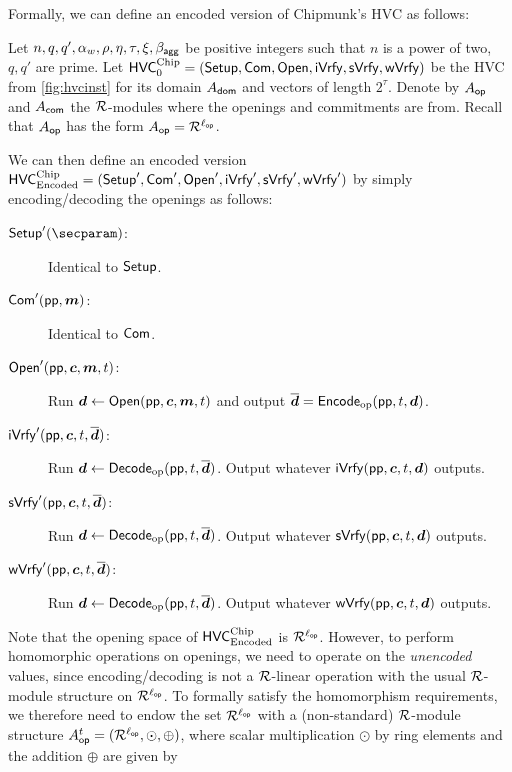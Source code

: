 Formally, we can define an encoded version of Chipmunk's HVC as follows:
\begin{definition}\label{def:encodedhvc}
Let $n,q,q',\alpha_w,\rho,\eta,\tau,\xi,\beta_{\mathsf{agg}}$ be positive integers such that $n$ is a power of two, $q,q'$ are prime.
Let $\mathsf{HVC}^{\textup{Chip}}_{0} = (\mathsf{Setup},\mathsf{Com},\mathsf{Open},\mathsf{iVrfy},\mathsf{sVrfy}, \mathsf{wVrfy})$ be the HVC from \autoref{fig:hvcinst} for its domain $A_{\mathsf{dom}}$ and vectors of length $2^\tau$.
Denote by $A_{\mathsf{op}}$ and $A_{\mathsf{com}}$ the $\mathcal{R}$-modules where the openings and commitments are from.
Recall that $A_{\mathsf{op}}$ has the form $A_{\mathsf{op}} = \mathcal{R}^{\ell_{\mathsf{op}}}$.

We can then define an encoded version $\mathsf{HVC}_{\textup{Encoded}}^{\textup{Chip}} = (\mathsf{Setup}',\mathsf{Com}',\mathsf{Open}',\mathsf{iVrfy}',\mathsf{sVrfy}', \mathsf{wVrfy}')$ by simply encoding/decoding the openings as follows:
\begin{description}
    \item[$\setup'(\secparam)$:] Identical to $\mathsf{Setup}$.
    \item[$\mathsf{Com}'(\mathsf{pp}, \boldsymbol{m})$:] Identical to $\mathsf{Com}$.
    \item[$\mathsf{Open}'(\mathsf{pp},\boldsymbol{c},\boldsymbol{m},t)$:] Run $\boldsymbol{d}\gets\mathsf{Open}(\mathsf{pp},\boldsymbol{c},\boldsymbol{m},t)$ and output $\overline{\boldsymbol{d}} = \mathsf{Encode}_{\mathrm{op}}(\mathsf{pp}, t, \boldsymbol{d})$.
    \item[$\mathsf{iVrfy}'(\mathsf{pp}, \boldsymbol{c},t,\overline{\boldsymbol{d}})$:] Run $\boldsymbol{d}\gets\mathsf{Decode}_{\mathrm{op}}(\mathsf{pp},t,\overline{\boldsymbol{d}})$. Output whatever $\mathsf{iVrfy}(\mathsf{pp},\boldsymbol{c},t,\boldsymbol{d})$ outputs.
    \item[$\mathsf{sVrfy}'(\mathsf{pp}, \boldsymbol{c},t,\overline{\boldsymbol{d}})$:] Run $\boldsymbol{d}\gets\mathsf{Decode}_{\mathrm{op}}(\mathsf{pp},t,\overline{\boldsymbol{d}})$. Output whatever $\mathsf{sVrfy}(\mathsf{pp},\boldsymbol{c},t,\boldsymbol{d})$ outputs.
    \item[$\mathsf{wVrfy}'(\mathsf{pp}, \boldsymbol{c},t,\overline{\boldsymbol{d}})$:] Run $\boldsymbol{d}\gets\mathsf{Decode}_{\mathrm{op}}(\mathsf{pp},t,\overline{\boldsymbol{d}})$. Output whatever $\mathsf{wVrfy}(\mathsf{pp},\boldsymbol{c},t,\boldsymbol{d})$ outputs.
\end{description}
\end{definition}
Note that the opening space of $\mathsf{HVC}_{\textup{Encoded}}^{\textup{Chip}}$ is $\mathcal{R}^{\ell_{\mathsf{op}}}$.
However, to perform homomorphic operations on openings, we need to operate on the \emph{unencoded} values, since encoding/decoding is not a $\mathcal{R}$-linear operation with the usual $\mathcal{R}$-module structure on $\mathcal{R}^{\ell_{\mathsf{op}}}$.
To formally satisfy the homomorphism requirements, we therefore need to endow the set $\mathcal{R}^{\ell_{\mathsf{op}}}$ with a (non-standard) $\mathcal{R}$-module structure $A_{\mathsf{op}}^{t} = (\mathcal{R}^{\ell_{\mathsf{op}}}, \odot, \oplus)$, where scalar multiplication $\odot$ by ring elements and the addition $\oplus$ are given by
